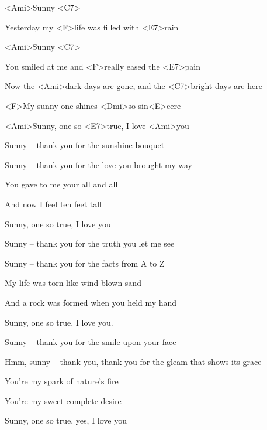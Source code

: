 

\zs
<Ami>Sunny <C7>

Yesterday my <F>life was filled with <E7>rain

<Ami>Sunny <C7>

You smiled at me and <F>really eased the <E7>pain

Now the <Ami>dark days are gone, and the <C7>bright days are here

<F>My sunny one shines <Dmi>so sin<E>cere

<Ami>Sunny, one so <E7>true, I love <Ami>you
\ks

\zs
Sunny – thank you for the sunshine bouquet

Sunny – thank you for the love you brought my way

You gave to me your all and all

And now I feel ten feet tall

Sunny, one so true, I love you
\ks

\zs
Sunny – thank you for the truth you let me see

Sunny – thank you for the facts from A to Z

My life was torn like wind-blown sand

And a rock was formed when you held my hand

Sunny, one so true, I love you.
\ks

\zs
Sunny – thank you for the smile upon your face

Hmm, sunny – thank you, thank you for the gleam that shows its grace

You're my spark of nature's fire

You're my sweet complete desire

Sunny, one so true, yes, I love you
\ks

\kp
